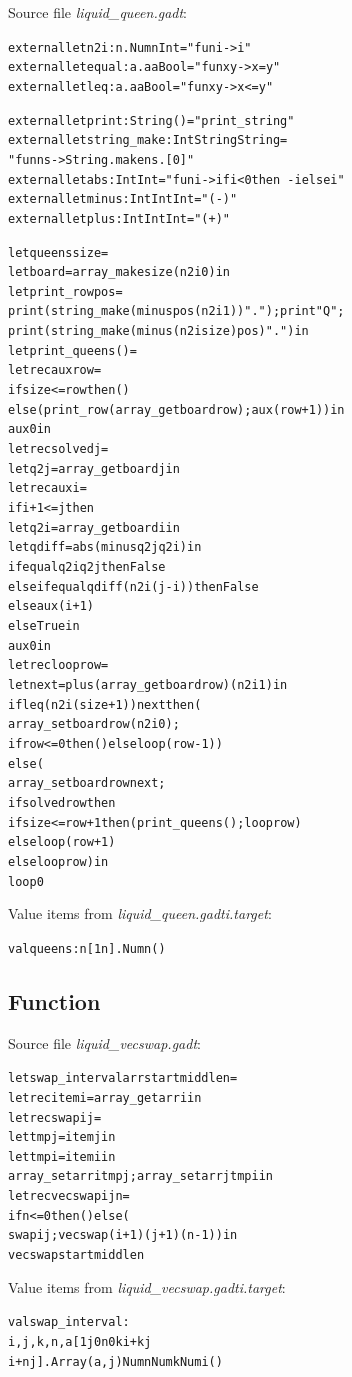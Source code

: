 \documentclass{article}
\newcommand{\tmem}[1]{{\em #1\/}}
\newcommand{\tmverbatim}[1]{{\ttfamily{#1}}}
\newenvironment{tmcode}[1][]{\begin{alltt}}{\end{alltt}}
\begin{document}
Source file {\tmem{liquid\_queen.gadt}}:
\begin{tmcode}
external let n2i : n. Num n  Int = "fun i -> i"
external let equal : a. a  a  Bool = "fun x y -> x = y"
external let leq : a. a  a  Bool = "fun x y -> x <= y"

external let print : String  () = "print_string"
external let string_make : Int  String  String =
  "fun n s -> String.make n s.[0]"
external let abs : Int  Int = "fun i -> if i < 0 then ~-i else i"
external let minus : Int  Int  Int = "(-)"
external let plus : Int  Int  Int = "(+)"

let queens size =
  let board = array_make size (n2i 0) in
  let print_row pos =
    print (string_make (minus pos (n2i 1)) "."); print "Q";
    print (string_make (minus (n2i size) pos) ".") in
  let print_queens () =
    let rec aux row =
      if size <= row then ()
      else (print_row (array_get board row); aux (row + 1)) in
    aux 0 in
  let rec solved j =
    let q2j = array_get board j in
    let rec aux i =
      if i + 1 <= j then
        let q2i = array_get board i in
        let qdiff = abs (minus q2j q2i) in
        if equal q2i q2j then False
        else if equal qdiff (n2i (j - i)) then False
        else aux (i + 1)
      else True in
    aux 0 in
  let rec loop row =
    let next = plus (array_get board row) (n2i 1) in
    if leq (n2i (size + 1)) next then (
      array_set board row (n2i 0);
      if row <= 0 then () else loop (row - 1))
    else (
      array_set board row next;
      if solved row then
        if size <= row + 1 then (print_queens (); loop row)
        else loop (row + 1)
      else loop row) in
  loop 0
\end{tmcode}
Value items from {\tmem{liquid\_queen.gadti.target}}:
\begin{tmcode}
val queens : n[1  n]. Num n  ()
\end{tmcode}

\subsection{Function \tmverbatim{swap\_interval}}

Source file {\tmem{liquid\_vecswap.gadt}}:
\begin{tmcode}
let swap_interval arr start middle n =
  let rec item i = array_get arr i in
  let rec swap i j =
    let tmpj = item j in
    let tmpi = item i in
    array_set arr i tmpj; array_set arr j tmpi in
  let rec vecswap i j n =
    if n <= 0 then () else (
      swap i j; vecswap (i + 1) (j + 1) (n - 1)) in
  vecswap start middle n
\end{tmcode}
Value items from {\tmem{liquid\_vecswap.gadti.target}}:
\begin{tmcode}
val swap_interval :
   i, j, k, n, a[1  j  0  n  0  k  i + k  j 
   i + n  j]. Array (a, j)  Num n  Num k  Num i  ()
\end{tmcode}
\end{document}
